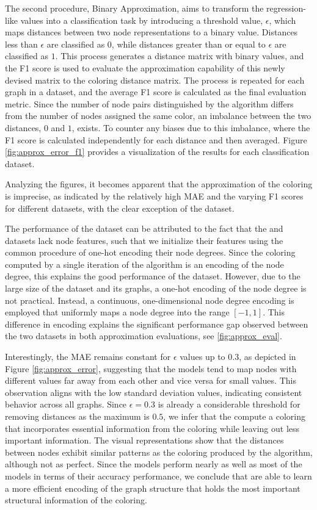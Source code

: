 The second procedure, Binary Approximation, aims to transform the regression-like values into a classification task by introducing a threshold value, $\epsilon$, which maps distances between two node representations to a binary value. Distances less than $\epsilon$ are classified as $0$, while distances greater than or equal to $\epsilon$ are classified as $1$. This process generates a distance matrix with binary values, and the F1 score is used to evaluate the approximation capability of this newly devised matrix to the \wl coloring distance matrix. The process is repeated for each graph in a dataset, and the average F1 score is calculated as the final evaluation metric. Since the number of node pairs distinguished by the \wl algorithm differs from the number of nodes assigned the same color, an imbalance between the two distances, $0$ and $1$, exists. To counter any biases due to this imbalance, where the F1 score is calculated independently for each distance and then averaged. Figure \ref{fig:approx_error_f1} provides a visualization of the results for each classification dataset.

Analyzing the figures, it becomes apparent that the approximation of the \wl coloring is imprecise, as indicated by the relatively high MAE and the varying F1 scores for different datasets, with the clear exception of the \imdb dataset.

The performance of the \imdb dataset can be attributed to the fact that the \imdb and \reddit datasets lack node features, such that we initialize their features using the common procedure of one-hot encoding their node degrees. Since the coloring computed by a single iteration of the \wl algorithm is an encoding of the node degree, this explains the good performance of the \imdb dataset. However, due to the large size of the \reddit dataset and its graphs, a one-hot encoding of the node degree is not practical. Instead, a continuous, one-dimensional node degree encoding is employed that uniformly maps a node degree into the range $[-1, 1]$. This difference in encoding explains the significant performance gap observed between the two datasets in both approximation evaluations, see \cref{fig:approx_eval}.

Interestingly, the MAE remains constant for $\epsilon$ values up to $0.3$, as depicted in Figure \ref{fig:approx_error}, suggesting that the \gnn models tend to map nodes with different values far away from each other and vice versa for small values. This observation aligns with the low standard deviation values, indicating consistent behavior across all graphs. Since $\epsilon = 0.3$ is already a considerable threshold for removing distances as the maximum is $0.5$, we infer that the \gnns compute a coloring that incorporates essential information from the \wl coloring while leaving out less important information. The visual representations show that the distances between nodes exhibit similar patterns as the coloring produced by the \wl algorithm, although not as perfect. Since the \gnn models perform nearly as well as most of the \wlnn models in terms of their accuracy performance, we conclude that \gnns are able to learn a more efficient encoding of the graph structure that holds the most important structural information of the \wl coloring.

